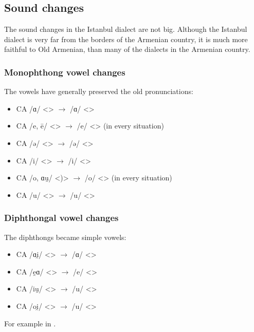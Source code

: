 \subsection{Sound changes}\label{sec:Istanbul:phono:soundchange}
The sound changes in the Istanbul dialect are not big. Although the Istanbul dialect is very far from the borders of the Armenian country, it is much more faithful to Old Armenian, than many of the dialects in the Armenian country. 

\subsubsection{Monophthong vowel changes}

The vowels have generally preserved the old pronunciations:
\begin{itemize}
	\item CA /ɑ/ <> $\rightarrow$ /ɑ/ <> 
	\item CA /e, ē/ <> $\rightarrow$ /e/ <> (in every situation)
	\item CA /ə/ <> $\rightarrow$ /ə/ <> 
	\item CA /i/ <> $\rightarrow$ /i/ <> 
	\item CA /o, ɑu̯/ <)> $\rightarrow$ /o/ <> (in every situation)
	\item CA /u/ <> $\rightarrow$ /u/ <> 
\end{itemize}

\subsubsection{Diphthongal vowel changes}\label{sec:Istanbul:phono:soundchange:diph}

The diphthongs became simple vowels:
\begin{itemize}
	\item CA /ɑi̯/ <> $\rightarrow$ /ɑ/ <> 
	\item CA /e̯ɑ/ <> $\rightarrow$ /e/ <> 
	\item CA /iu̯/ <> $\rightarrow$ /u/ <> 
	\item CA /oi̯/ <> $\rightarrow$ /u/ <> 
\end{itemize}



For example in . 



